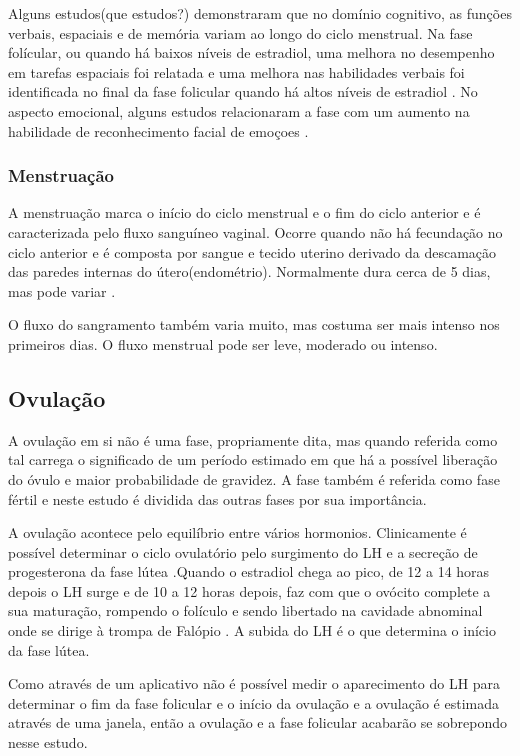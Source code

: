 Alguns estudos(que estudos?) demonstraram que no domínio cognitivo, as funções verbais, espaciais e de memória variam ao longo do ciclo menstrual. Na fase folícular, ou quando há baixos níveis de estradiol, uma melhora no desempenho em tarefas espaciais foi relatada \cite{hausmann2000} e uma melhora nas habilidades verbais foi identificada no final da fase folicular quando há altos níveis de estradiol \cite{Rosenberg2002}. No aspecto emocional, alguns estudos relacionaram a fase com um aumento na habilidade de reconhecimento facial de emoçoes \cite{derntl2013}.


\subsubsection{Menstruação}

A menstruação marca o início do ciclo menstrual e o fim do ciclo anterior e é caracterizada pelo fluxo sanguíneo vaginal. Ocorre quando não há fecundação no ciclo anterior e é composta por sangue e tecido uterino derivado da descamação das paredes internas do útero(endométrio). Normalmente dura cerca de 5 dias, mas pode variar \cite{guyton2012}.

O fluxo do sangramento também varia muito, mas costuma ser mais intenso nos primeiros dias. O fluxo menstrual pode ser leve, moderado ou intenso.

\subsection{Ovulação}

A ovulação em si não é uma fase, propriamente dita, mas quando referida como tal carrega o significado de um período estimado em que há a possível liberação do óvulo e maior probabilidade de gravidez. A fase também é referida como fase fértil e neste estudo é dividida das outras fases por sua importância.

A ovulação acontece pelo equilíbrio entre vários hormonios. Clinicamente é possível determinar o ciclo ovulatório pelo surgimento do LH e a secreção de progesterona da fase lútea \cite{fritz2010}.Quando o estradiol chega ao pico, de 12 a 14 horas depois o LH surge e de 10 a 12 horas depois, faz com que o ovócito complete a sua maturação, rompendo o folículo e sendo libertado na cavidade abnominal onde se dirige à trompa de Falópio \cite{fritz2010}. A subida do LH é o que determina o início da fase lútea.

Como através de um aplicativo não é possível medir o aparecimento do LH para determinar o fim da fase folicular e o início da ovulação e a ovulação é estimada através de uma janela, então a ovulação e a fase folicular acabarão se sobrepondo nesse estudo.

